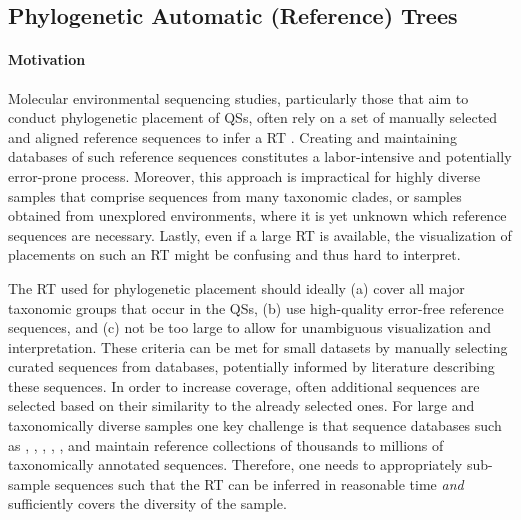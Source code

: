 
\subsection{Phylogenetic Automatic (Reference) Trees}
\label{ch:AutomaticTrees:sec:Methods:sub:PhAT}

\paragraph{Motivation}
\label{ch:AutomaticTrees:sec:Methods:sub:PhAT:par:Motivation}

Molecular environmental sequencing studies, particularly those that aim to conduct phylogenetic placement of \acfp{QS},
often rely on a set of manually selected and aligned reference sequences
to infer a \acf{RT} \cite{Tedersoo2014,DeVargas2015,Mahe2017,Thompson2017}. %
Creating and maintaining databases of such reference sequences constitutes a labor-intensive and potentially error-prone process.
Moreover, this approach is impractical for highly diverse samples that comprise sequences from many taxonomic clades,
or samples obtained from unexplored environments, where it is yet unknown which reference sequences are necessary.
Lastly, even if a large \ac{RT} is available,
the visualization of placements on such an \ac{RT} might be confusing and thus hard to interpret.

The \ac{RT} used for phylogenetic placement should ideally
(a) cover all major taxonomic groups that occur in the \acp{QS},
(b) use high-quality error-free reference sequences, and
(c) not be too large to allow for unambiguous visualization and interpretation.
These criteria can be met for small datasets by manually selecting curated sequences from databases,
potentially informed by literature describing these sequences.
In order to increase coverage, often additional sequences are selected
based on their similarity to the already selected ones.
For large and taxonomically diverse samples one key challenge is that sequence databases such as
 \cite{DeSantis2006},  \cite{Abarenkov2010},  \cite{Guillou2012},
 \cite{Kim2012},  \cite{Quast2013}, and  \cite{Cole2014}
maintain reference collections of thousands to millions of taxonomically annotated sequences.
Therefore, one needs to appropriately sub-sample sequences such that the \ac{RT}
can be inferred in reasonable time {\em and} sufficiently covers the diversity of the sample.

